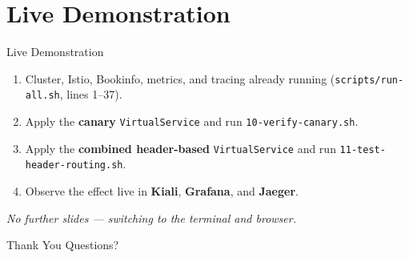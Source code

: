 \documentclass[aspectratio=169]{beamer}
\begin{document}
\section{Live Demonstration}

\begin{frame}{Live Demonstration}
  \begin{enumerate}
    \item Cluster, Istio, Bookinfo, metrics, and tracing already running
          (\texttt{scripts/run-all.sh}, lines 1--37).
    \item Apply the \textbf{canary} \texttt{VirtualService} and run
          \texttt{10-verify-canary.sh}.
    \item Apply the \textbf{combined header-based} \texttt{VirtualService} and run
          \texttt{11-test-header-routing.sh}.
    \item Observe the effect live in \textbf{Kiali}, \textbf{Grafana}, and \textbf{Jaeger}.
  \end{enumerate}
  \vspace{0.5cm}
  \centering
  \textit{No further slides --- switching to the terminal and browser.}
\end{frame}

\begin{frame}{Thank You}
  \centering
  \Large Questions?
\end{frame}
\end{document}
